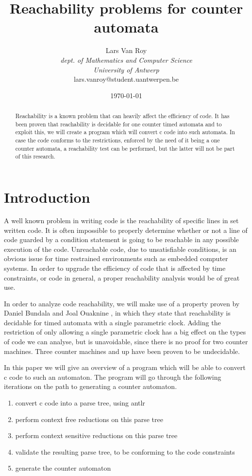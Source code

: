 \documentclass[12pt]{article}
\title{Reachability problems for counter automata}
\author{Lars Van Roy\\
\textit{dept. of Mathematics and Computer Science} \\
\textit{University of Antwerp}\\
lars.vanroy@student.uantwerpen.be}
\date{\today}
\begin{document}
\maketitle{}

\begin{abstract}
\noindent
Reachability is a known problem that can heavily affect the efficiency of code. It has been proven that reachability is decidable for one counter timed automata and to exploit this, we will create a program which will convert c code into such automata. In case the code conforms to the restrictions, enforced by the need of it being a one counter automata, a reachability test can be performed, but the latter will not be part of this research.
\end{abstract}

\section{Introduction}
A well known problem in writing code is the reachability of specific lines in set written code. It is often impossible to properly determine whether or not a line of code guarded by a condition statement is going to be reachable in any possible execution of the code. Unreachable code, due to unsatisfiable conditions, is an obvious issue for time restrained environments such as embedded computer systems. In order to upgrade the efficiency of code that is affected by time constraints, or code in general, a proper reachability analysis would be of great use. \newpage

In order to analyze code reachability, we will make use of a property proven by Daniel Bundala and Joal Ouaknine \cite{danialandjoel}, in which they state that reachability is decidable for timed automata with a single parametric clock. Adding the restriction of only allowing a single parametric clock has a big effect on the types of code we can analyse, but is unavoidable, since there is no proof for two counter machines. Three counter machines and up have been proven to be undecidable.

In this paper we will give an overview of a program which will be able to convert c code to such an automaton. The program will go through the following iterations on the path to generating a counter automaton.

\begin{enumerate}
	\item convert c code into a parse tree, using antlr
	\item perform context free reductions on this parse tree
	\item perform context sensitive reductions on this parse tree
	\item validate the resulting parse tree, to be conforming to the code constraints
	\item generate the counter automaton
\end{enumerate}
\end{document}
